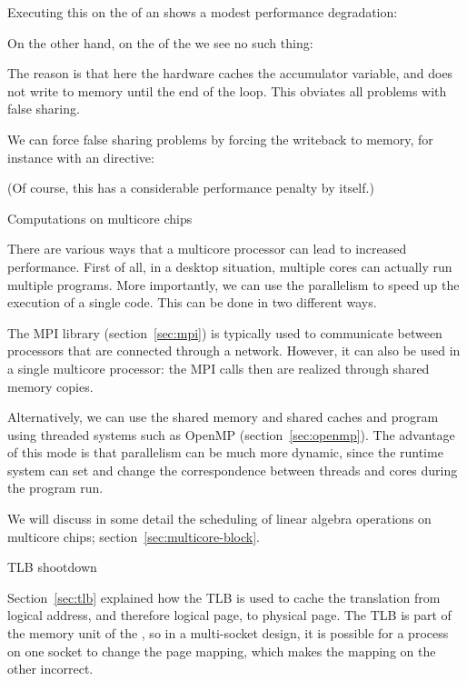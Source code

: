 Executing this on the 
of an 
shows a modest performance degradation:
%


On the other hand, on the 
of the  we see no such thing:
%


The reason is that here the hardware caches the accumulator variable,
and does not write to memory until the end of the loop.
This obviates all problems with false sharing.

We can force false sharing problems by forcing the writeback to memory,
for instance with an  directive:
%


(Of course, this has a considerable performance penalty by itself.)


 {Computations on multicore chips}

There are various ways that a multicore processor can lead to
increased performance. First of all, in a desktop situation, multiple
cores can actually run multiple programs. More importantly, we can use
the parallelism to speed up the execution of a single code. This can
be done in two different ways.

The MPI library (section~\ref{sec:mpi}) is typically used to
communicate between processors that are connected through a
network. However, it can also be used in a single multicore processor:
the MPI calls then are realized through shared memory copies.

Alternatively, we can use the shared memory and shared caches and
program using threaded systems such as OpenMP
(section~\ref{sec:openmp}). The advantage of this mode is that
parallelism can be much more dynamic, since the runtime system can set
and change
the correspondence between threads and cores during the program run.

We will discuss in some detail the
scheduling of linear algebra operations on multicore chips;
section~\ref{sec:multicore-block}.

 {TLB shootdown}

Section~\ref{sec:tlb} explained how the \ac{TLB} is used to cache
the translation from logical address, and therefore logical page, to
physical page. The TLB is part of the memory unit of the , so in
a multi-socket design, it is possible for a process on one socket to
change the page mapping, which makes the mapping on the other
incorrect.

